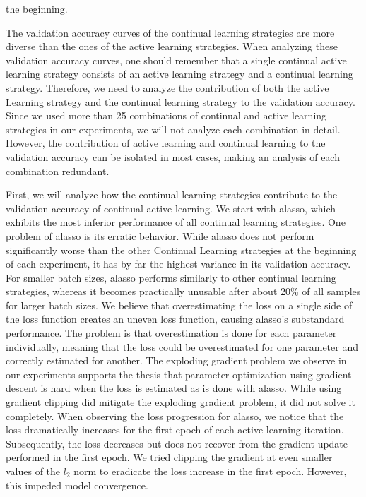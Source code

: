the beginning. \par
The validation accuracy curves of the continual learning strategies are more diverse than the ones of the active learning strategies. When analyzing these
validation accuracy curves, one should remember that a single continual active learning strategy consists of an active learning
strategy and a continual learning strategy. Therefore, we need to analyze the contribution of both the active Learning strategy and the continual learning
strategy to the validation accuracy. Since we used more than 25 combinations of continual and active learning strategies in our experiments, we will not
analyze each combination in detail. However, the contribution of active learning and continual learning to the validation
accuracy can be isolated in most cases, making an analysis of each combination redundant. \par
First, we will analyze how the continual learning strategies contribute to the validation accuracy of continual active learning. We start with \gls{alasso},
which exhibits the most inferior performance of all continual learning strategies. One problem of \gls{alasso} is its erratic behavior. While
\gls{alasso} does not perform significantly worse than the other Continual Learning strategies at the beginning of each experiment, it has by far the highest
variance in its validation accuracy. For smaller batch sizes, \gls{alasso} performs similarly to other continual learning strategies, whereas it becomes practically
unusable after about 20\% of all samples for larger batch sizes. We believe that overestimating the loss on a single side of the loss function creates an uneven loss function,
causing \gls{alasso}'s substandard performance. The problem is that overestimation is done for each parameter individually, meaning that the loss could be
overestimated for one parameter and correctly estimated for another. The exploding gradient problem we observe in our experiments supports the thesis that
parameter optimization using gradient descent is hard when the loss is estimated as is done with \gls{alasso}. While using gradient clipping did mitigate the
exploding gradient problem, it did not solve it completely. When observing the loss progression for \gls{alasso}, we notice that the loss dramatically increases
for the first epoch of each active learning iteration. Subsequently, the loss decreases but does not recover from the gradient update performed in the first epoch.
We tried clipping the gradient at even smaller values of the $l_2$ norm to eradicate the loss increase in the first epoch. However, this impeded model convergence. \par
